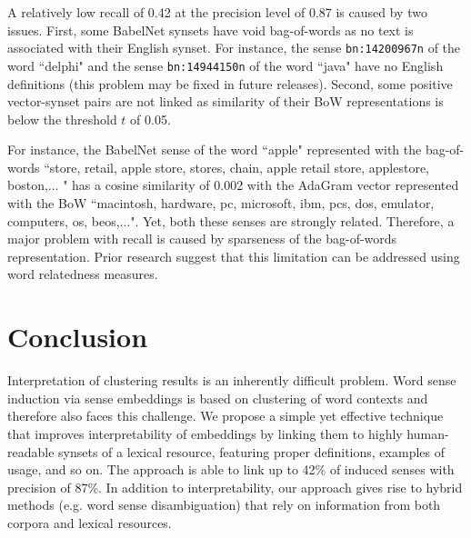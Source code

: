 \documentclass[10pt, a4paper]{article}
\begin{document}
A relatively low recall of 0.42 at the precision level of 0.87 is caused by two issues. First, some BabelNet synsets have void bag-of-words as no text is associated with their English synset. For instance, the sense \texttt{\small bn:14200967n} of the word ``delphi" and the sense \texttt{\small bn:14944150n} of the word ``java" have no English definitions (this problem may be fixed in future releases). Second, some positive vector-synset pairs are not linked as similarity of their BoW representations is below the threshold $t$ of 0.05. 

For instance, the BabelNet sense of the word ``apple" represented with the bag-of-words ``store, retail, apple store, stores, chain, apple retail store, applestore, boston,... "	has a cosine similarity of 0.002 with the AdaGram vector represented with the BoW ``macintosh, hardware, pc, microsoft, ibm, pcs, dos, emulator, computers, os, beos,...". Yet, both these senses are strongly related. Therefore, a major problem with recall is caused by sparseness of the bag-of-words representation. Prior research \cite{bar2012ukp} suggest that this limitation can be addressed using word relatedness measures. 







\section{Conclusion}
\label{sec:conc}

Interpretation of clustering results is an inherently difficult problem. Word sense induction via sense embeddings is based on clustering of word contexts and therefore also faces this challenge. We propose a simple yet effective technique that improves interpretability of embeddings by linking them to highly human-readable synsets of a lexical resource, featuring proper definitions, examples of usage, and so on. The approach is able to link up to 42\% of induced senses with precision of 87\%. In addition to interpretability, our approach gives rise to hybrid methods (e.g. word sense disambiguation) that rely on information from both corpora and lexical resources.  
\end{document}
